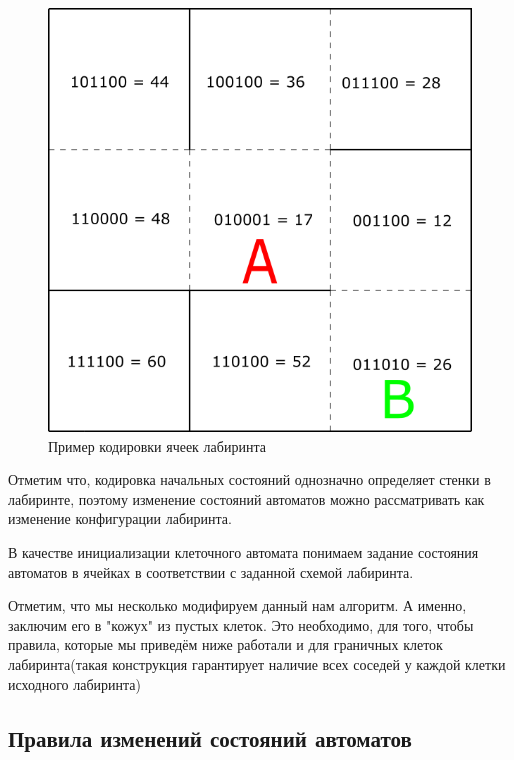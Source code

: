 \documentclass[12pt]{article}
\begin{document}
\begin{minipage}{\linewidth}
\begin{minipage}{0.4\linewidth}
\begin{figure}[H]
              \includegraphics[width=\linewidth]{draw2}
              \caption{Пример кодировки ячеек лабиринта}
              \label{fig:bits_ex}
          \end{figure}
      \end{minipage}
  \end{minipage}

Отметим что, кодировка начальных состояний однозначно определяет стенки в лабиринте, поэтому изменение состояний автоматов можно рассматривать как изменение конфигурации лабиринта.

В качестве инициализации клеточного автомата понимаем задание состояния автоматов в ячейках в соответствии с заданной схемой лабиринта.

Отметим, что мы несколько модифируем данный нам алгоритм. А именно, заключим его в "кожух" из пустых клеток. Это необходимо, для того, чтобы правила, которые мы приведём ниже работали и для граничных клеток лабиринта(такая конструкция гарантирует наличие всех соседей у каждой клетки исходного лабиринта)

\subsection*{Правила изменений состояний автоматов}
\end{document}
